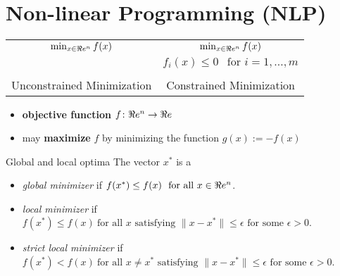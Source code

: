

%
%
\chapter{Non-linear Programming (NLP)}
\begin{center}
\begin{tabular}{|c|c|}
\hline
$
\min_{x \in \Re e^n} f(x)
$
& 
$\min_{x \in \Re e^n} f(x)$ \\
&$ f_i(x) \leq 0  \ \ \text{ for } i=1, \dots, m$\\
&\\
Unconstrained Minimization & Constrained Minimization\\
\hline
\end{tabular}
\end{center}

\begin{itemize}
\item \textbf{objective function} $f \colon \Re e^n \to \Re e$
\item may \textbf{maximize} $f$ by minimizing the function $g(x) := -f(x)$
\end{itemize}


\begin{definition}{}{Global and local optima}
The vector $x^*$ is a
\begin{itemize}
\item  \emph{global minimizer} if $f(x^*) \leq f(x) \ \mbox{ for all } x \in \Re e^n$.
\item  \emph{local minimizer} if $f(x^*) \leq f(x) \ \text{for all } x \text{ satisfying } \| x- x^*\| \leq \epsilon \text{ for some } \epsilon > 0$.
\item \emph{strict local minimizer} if $f(x^*) < f(x) \ \text{for all } x \neq x^* \text{ satisfying } \| x- x^*\| \leq \epsilon \text{ for some } \epsilon > 0$.
\end{itemize}
\end{definition}

\begin{center}
\end{center}


